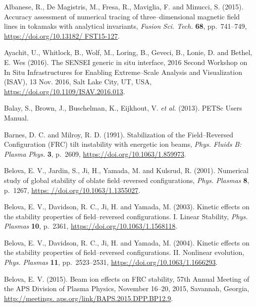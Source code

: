 \documentclass[a4paper,openany,12pt]{book}
\begin{document}
\begin{thebibliography}{100}

\bibitem{}
 Albanese, R., De Magistris, M., Fresa, R., Maviglia, F. and Minucci, S. (2015). Accuracy assessment of numerical tracing of three--dimensional magnetic field lines in tokamaks with analytical invariants, \emph{Fusion Sci. Tech.} \textbf{68}, pp.~741--749, \url{https://doi.org/10.13182/ FST15-127}.

\bibitem{}
Ayachit, U., Whitlock, B., Wolf, M., Loring, B., Geveci, B., Lonie, D. and Bethel, E. Wes (2016). The SENSEI generic in situ interface, 2016 Second Workshop on In Situ Infrastructures for Enabling Extreme--Scale Analysis and Visualization (ISAV), 13 Nov. 2016, Salt Lake City, UT, USA, \url{https://doi.org/10.1109/ISAV.2016.013}.

\bibitem{}
Balay, S., Brown, J., Buschelman, K., Eijkhout, V. \emph{et al.} (2013). PETSc Users Manual.

\bibitem{}
Barnes, D. C. and Milroy, R. D. (1991). Stabilization of the Field--Reversed Configuration (FRC) tilt instability with energetic ion beams, \emph{Phys. Fluids B: Plasma Phys.} \textbf{3}, p.~2609, \url{https://doi.org/10.1063/1.859973}.

\bibitem{}
Belova, E. V., Jardin, S., Ji, H., Yamada, M. and Kulsrud, R. (2001). Numerical study of global stability of oblate field--reversed configurations, \emph{Phys. Plasmas} \textbf{8}, p.~1267, \url{https: //doi.org/10.1063/1.1355027}.

\bibitem{}
Belova, E. V., Davidson, R. C., Ji, H. and Yamada, M. (2003). Kinetic effects on the stability properties of field--reversed configurations. I. Linear Stability, \emph{Phys. Plasmas} \textbf{10}, p.~2361, \url{https://doi.org/10.1063/1.1568118}.

\bibitem{}
Belova, E. V., Davidson, R. C., Ji, H. and Yamada, M. (2004). Kinetic effects on the stability properties of field--reversed configurations. II. Nonlinear evolution, \emph{Phys. Plasmas} \textbf{11}, pp.~2523--2531, \url{https://doi.org/10.1063/1.1666293}.

\bibitem{}
Belova, E. V. (2015). Beam ion effects on FRC stability, 57th Annual Meeting of the APS Division of Plasma Physics, November 16--20, 2015, Savannah, Georgia, \url{http://meetings. aps.org/link/BAPS.2015.DPP.BP12.9}.


\end{thebibliography}
\end{document}
